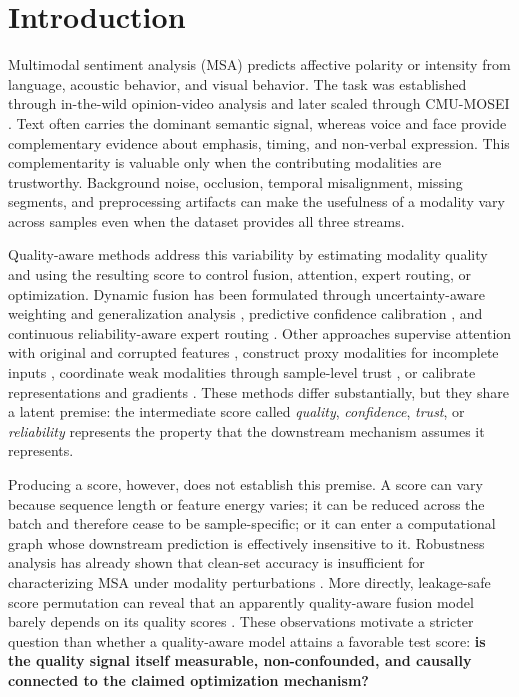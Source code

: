 \section{Introduction}\label{introduction}

Multimodal sentiment analysis (MSA) predicts affective polarity or
intensity from language, acoustic behavior, and visual behavior. The
task was established through in-the-wild opinion-video analysis and
later scaled through CMU-MOSEI
\cite{zadeh2016multimodal, zadeh2018mosei}. Text often carries the
dominant semantic signal, whereas voice and face provide complementary
evidence about emphasis, timing, and non-verbal expression. This
complementarity is valuable only when the contributing modalities are
trustworthy. Background noise, occlusion, temporal misalignment, missing
segments, and preprocessing artifacts can make the usefulness of a
modality vary across samples even when the dataset provides all three
streams.

Quality-aware methods address this variability by estimating modality
quality and using the resulting score to control fusion, attention,
expert routing, or optimization. Dynamic fusion has been formulated
through uncertainty-aware weighting and generalization analysis
\cite{zhang2023qmf}, predictive confidence calibration
\cite{cao2024pdf}, and continuous reliability-aware expert routing
\cite{zhu2026qamoe}. Other approaches supervise attention with original
and corrupted features \cite{mai2025samlml}, construct proxy modalities
for incomplete inputs \cite{zhu2025prmf}, coordinate weak modalities
through sample-level trust \cite{he2026ebmc}, or calibrate
representations and gradients \cite{jiang2026cpsc}. These methods
differ substantially, but they share a latent premise: the intermediate
score called \emph{quality}, \emph{confidence}, \emph{trust}, or
\emph{reliability} represents the property that the downstream mechanism
assumes it represents.

Producing a score, however, does not establish this premise. A score can
vary because sequence length or feature energy varies; it can be reduced
across the batch and therefore cease to be sample-specific; or it can
enter a computational graph whose downstream prediction is effectively
insensitive to it. Robustness analysis has already shown that clean-set
accuracy is insufficient for characterizing MSA under modality
perturbations \cite{hazarika2022robustness}. More directly,
leakage-safe score permutation can reveal that an apparently
quality-aware fusion model barely depends on its quality scores
\cite{moon2026quality}. These observations motivate a stricter question
than whether a quality-aware model attains a favorable test score:
\textbf{is the quality signal itself measurable, non-confounded, and
causally connected to the claimed optimization mechanism?}

